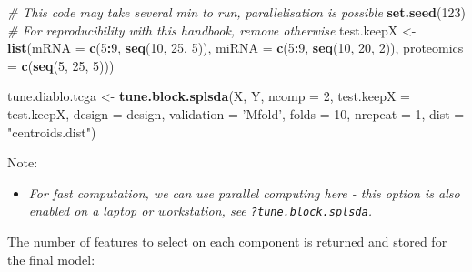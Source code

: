 \documentclass[]{book}
\newenvironment{Shaded}{\begin{snugshade}}{\end{snugshade}}
\newcommand{\KeywordTok}[1]{\textcolor[rgb]{0.13,0.29,0.53}{\textbf{#1}}}
\newcommand{\DataTypeTok}[1]{\textcolor[rgb]{0.13,0.29,0.53}{#1}}
\newcommand{\DecValTok}[1]{\textcolor[rgb]{0.00,0.00,0.81}{#1}}
\newcommand{\StringTok}[1]{\textcolor[rgb]{0.31,0.60,0.02}{#1}}
\newcommand{\CommentTok}[1]{\textcolor[rgb]{0.56,0.35,0.01}{\textit{#1}}}
\newcommand{\OperatorTok}[1]{\textcolor[rgb]{0.81,0.36,0.00}{\textbf{#1}}}
\newcommand{\NormalTok}[1]{#1}
\providecommand{\tightlist}{%
  \setlength{\itemsep}{0pt}\setlength{\parskip}{0pt}}
\begin{document}
\begin{Shaded}
\begin{Highlighting}[]
\CommentTok{# This code may take several min to run, parallelisation is possible}
\KeywordTok{set.seed}\NormalTok{(}\DecValTok{123}\NormalTok{) }\CommentTok{# For reproducibility with this handbook, remove otherwise}
\NormalTok{test.keepX <-}\StringTok{ }\KeywordTok{list}\NormalTok{(}\DataTypeTok{mRNA =} \KeywordTok{c}\NormalTok{(}\DecValTok{5}\OperatorTok{:}\DecValTok{9}\NormalTok{, }\KeywordTok{seq}\NormalTok{(}\DecValTok{10}\NormalTok{, }\DecValTok{25}\NormalTok{, }\DecValTok{5}\NormalTok{)),}
                   \DataTypeTok{miRNA =} \KeywordTok{c}\NormalTok{(}\DecValTok{5}\OperatorTok{:}\DecValTok{9}\NormalTok{, }\KeywordTok{seq}\NormalTok{(}\DecValTok{10}\NormalTok{, }\DecValTok{20}\NormalTok{, }\DecValTok{2}\NormalTok{)),}
                   \DataTypeTok{proteomics =} \KeywordTok{c}\NormalTok{(}\KeywordTok{seq}\NormalTok{(}\DecValTok{5}\NormalTok{, }\DecValTok{25}\NormalTok{, }\DecValTok{5}\NormalTok{)))}

\NormalTok{tune.diablo.tcga <-}\StringTok{ }\KeywordTok{tune.block.splsda}\NormalTok{(X, Y, }\DataTypeTok{ncomp =} \DecValTok{2}\NormalTok{, }
                              \DataTypeTok{test.keepX =}\NormalTok{ test.keepX, }\DataTypeTok{design =}\NormalTok{ design,}
                              \DataTypeTok{validation =} \StringTok{'Mfold'}\NormalTok{, }\DataTypeTok{folds =} \DecValTok{10}\NormalTok{, }\DataTypeTok{nrepeat =} \DecValTok{1}\NormalTok{, }
                              \DataTypeTok{dist =} \StringTok{"centroids.dist"}\NormalTok{)}
\end{Highlighting}
\end{Shaded}

Note:

\begin{itemize}
\tightlist
\item
  \emph{For fast computation, we can use parallel computing here - this
  option is also enabled on a laptop or workstation, see
  \texttt{?tune.block.splsda}.}
\end{itemize}

The number of features to select on each component is returned and
stored for the final model:

\begin{Shaded}
\end{Shaded}
\end{document}
